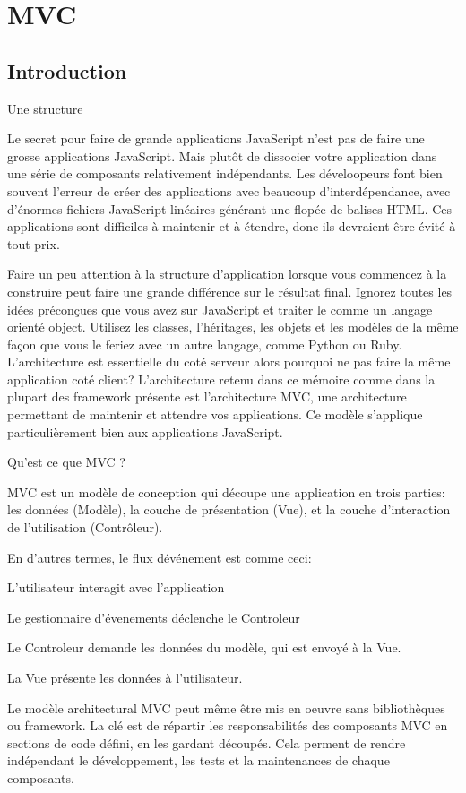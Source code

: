 \chapter{MVC}
\label{ch:mvc}

\section*{Introduction}

Une structure


Le secret pour faire de grande applications JavaScript n’est pas de faire une grosse applications JavaScript. Mais plutôt de dissocier votre application dans une série de composants relativement indépendants. Les déveloopeurs font bien souvent l’erreur de créer des applications avec beaucoup d’interdépendance, avec d’énormes fichiers JavaScript linéaires générant une flopée de balises HTML. Ces applications sont difficiles à maintenir et à étendre, donc ils devraient être évité à tout prix.

Faire un peu attention à la structure d’application lorsque vous commencez à la construire peut faire une grande différence sur le résultat final. Ignorez toutes les idées préconçues que vous avez sur JavaScript et traiter le comme un langage orienté object. Utilisez les classes, l’héritages, les objets et les modèles de la même façon que vous le feriez avec un autre langage, comme Python ou Ruby. L’architecture est essentielle du coté serveur alors pourquoi ne pas faire la même application coté client?  L’architecture retenu dans ce mémoire comme dans la plupart des framework présente est l’architecture MVC, une architecture permettant de maintenir et attendre vos applications. Ce modèle s’applique particulièrement bien aux applications JavaScript.

Qu’est ce que MVC ?

MVC est un modèle de conception qui découpe une application en trois parties: les données (Modèle), la couche de présentation (Vue), et la couche d’interaction de l’utilisation (Contrôleur).

En d’autres termes, le flux dévénement est comme ceci:

    L’utilisateur interagit avec l’application

    Le gestionnaire d’évenements déclenche le Controleur

    Le Controleur demande les données du modèle, qui est envoyé à la Vue.

    La Vue présente les données à l’utilisateur.


Le modèle architectural MVC peut même être mis en oeuvre sans bibliothèques ou framework. La clé est de répartir les responsabilités des composants MVC en sections de code défini, en les gardant découpés. Cela perment de rendre indépendant le développement, les tests et la maintenances de chaque composants.



